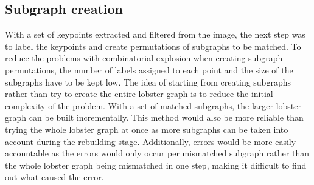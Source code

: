 \subsection{Subgraph creation}
With a set of keypoints extracted and filtered from the image, the next step was to label the keypoints and create permutations of subgraphs to be matched. To reduce the problems with combinatorial explosion 
when creating subgraph permutations, the number of labels assigned to each point and the size of the subgraphs have to be kept low. The idea of starting from creating subgraphs rather than try to create the entire lobster graph is to reduce the initial complexity of the problem. With a set of matched subgraphs, the larger lobster graph can be built incrementally. This method would also be more reliable than trying the whole lobster graph at once as more subgraphs can be taken into account during the rebuilding stage. Additionally, errors would be more easily accountable as the errors would only occur per mismatched subgraph rather than the whole lobster graph being mismatched in one step, making it difficult to find out what caused the error. 

